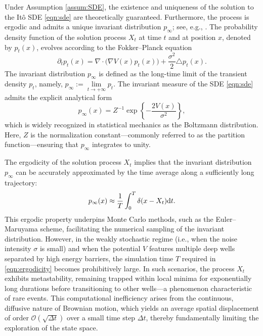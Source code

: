 Under Assumption \ref{assum:SDE}, the existence and uniqueness of the solution to the It\^{o} SDE \eqref{eqn:sde} are theoretically guaranteed. Furthermore, the process is ergodic and admits a unique invariant distribution $p_\infty$; see, e.g., \cite[Theorem 2.2, Theorem 2.4, Remark 5.5, Lemma 6.4]{xi2019jump}. The probability density function of the solution process $X_t$ at time $t$ and at position $x$, denoted by $p_t(x)$, evolves according to the Fokker--Planck equation
\begin{equation}
\label{eqn::fp}
   \partial_t p_t(x)  = \nabla\cdot\big(\nabla V(x) p_t(x)\big) + \frac{\sigma^2}{2} \triangle p_t(x).
\end{equation}
The invariant distribution $p_\infty$ is defined as the long-time limit of the transient density $p_t$, namely, $p_\infty:=\underset{t\to +\infty}{\lim}p_t$. The invariant measure of the SDE \eqref{eqn:sde} admits the explicit analytical form
\begin{equation}\label{p_infty}
    p_\infty(x)= Z^{-1}\exp\left\{-\frac{2V(x)}{\sigma^2}\right\},
\end{equation}
which is widely recognized in statistical mechanics as the Boltzmann distribution. Here, $Z$ is the normalization constant---commonly referred to as the partition function---ensuring that $p_\infty$ integrates to unity.


The ergodicity of the solution process $X_t$ implies that the invariant distribution $p_\infty$ can be accurately approximated by the time average along a sufficiently long trajectory:
\begin{equation}\label{eqn:ergodicity}
    p_\infty(x) \approx \frac{1}{T}\int_0^T\delta(x-X_t)\mathrm{d} t.
\end{equation}
This ergodic property underpins Monte Carlo methods, such as the Euler--Maruyama scheme, facilitating the numerical sampling of the invariant distribution. However, in the weakly stochastic regime (i.e., when the noise intensity $\sigma$ is small) and when the potential $V$ features multiple deep wells separated by high energy barriers, the simulation time $T$ required in \eqref{eqn:ergodicity} becomes prohibitively large. In such scenarios, the process $X_t$ exhibits metastability, remaining trapped within local minima for exponentially long durations before transitioning to other wells---a phenomenon characteristic of rare events. This computational inefficiency arises from the continuous, diffusive nature of Brownian motion, which yields an average spatial displacement of order $\mathcal{O}(\sqrt{\Delta t})$ over a small time step $\Delta t$, thereby fundamentally limiting the exploration of the state space.





